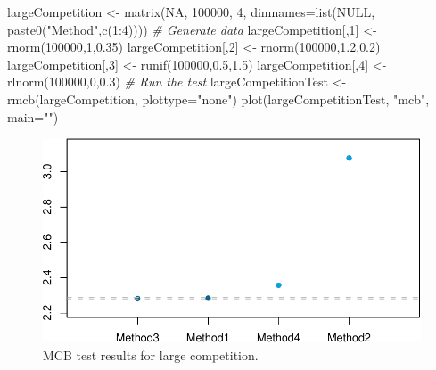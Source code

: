 \documentclass[
]{book}
\newenvironment{Shaded}{\begin{snugshade}}{\end{snugshade}}
\newcommand{\AttributeTok}[1]{\textcolor[rgb]{0.77,0.63,0.00}{#1}}
\newcommand{\CommentTok}[1]{\textcolor[rgb]{0.56,0.35,0.01}{\textit{#1}}}
\newcommand{\ConstantTok}[1]{\textcolor[rgb]{0.00,0.00,0.00}{#1}}
\newcommand{\DecValTok}[1]{\textcolor[rgb]{0.00,0.00,0.81}{#1}}
\newcommand{\FloatTok}[1]{\textcolor[rgb]{0.00,0.00,0.81}{#1}}
\newcommand{\FunctionTok}[1]{\textcolor[rgb]{0.00,0.00,0.00}{#1}}
\newcommand{\NormalTok}[1]{#1}
\newcommand{\OtherTok}[1]{\textcolor[rgb]{0.56,0.35,0.01}{#1}}
\newcommand{\SpecialCharTok}[1]{\textcolor[rgb]{0.00,0.00,0.00}{#1}}
\newcommand{\StringTok}[1]{\textcolor[rgb]{0.31,0.60,0.02}{#1}}
\theoremstyle{definition}
\theoremstyle{definition}
\theoremstyle{definition}
\theoremstyle{definition}
\theoremstyle{remark}
\begin{document}
\begin{Shaded}
\begin{Highlighting}[]
\NormalTok{largeCompetition }\OtherTok{\textless{}{-}} 
  \FunctionTok{matrix}\NormalTok{(}\ConstantTok{NA}\NormalTok{, }\DecValTok{100000}\NormalTok{, }\DecValTok{4}\NormalTok{,}
         \AttributeTok{dimnames=}\FunctionTok{list}\NormalTok{(}\ConstantTok{NULL}\NormalTok{, }\FunctionTok{paste0}\NormalTok{(}\StringTok{"Method"}\NormalTok{,}\FunctionTok{c}\NormalTok{(}\DecValTok{1}\SpecialCharTok{:}\DecValTok{4}\NormalTok{))))}
\CommentTok{\# Generate data}
\NormalTok{largeCompetition[,}\DecValTok{1}\NormalTok{] }\OtherTok{\textless{}{-}} \FunctionTok{rnorm}\NormalTok{(}\DecValTok{100000}\NormalTok{,}\DecValTok{1}\NormalTok{,}\FloatTok{0.35}\NormalTok{)}
\NormalTok{largeCompetition[,}\DecValTok{2}\NormalTok{] }\OtherTok{\textless{}{-}} \FunctionTok{rnorm}\NormalTok{(}\DecValTok{100000}\NormalTok{,}\FloatTok{1.2}\NormalTok{,}\FloatTok{0.2}\NormalTok{)}
\NormalTok{largeCompetition[,}\DecValTok{3}\NormalTok{] }\OtherTok{\textless{}{-}} \FunctionTok{runif}\NormalTok{(}\DecValTok{100000}\NormalTok{,}\FloatTok{0.5}\NormalTok{,}\FloatTok{1.5}\NormalTok{)}
\NormalTok{largeCompetition[,}\DecValTok{4}\NormalTok{] }\OtherTok{\textless{}{-}} \FunctionTok{rlnorm}\NormalTok{(}\DecValTok{100000}\NormalTok{,}\DecValTok{0}\NormalTok{,}\FloatTok{0.3}\NormalTok{)}
\CommentTok{\# Run the test}
\NormalTok{largeCompetitionTest }\OtherTok{\textless{}{-}} \FunctionTok{rmcb}\NormalTok{(largeCompetition, }\AttributeTok{plottype=}\StringTok{"none"}\NormalTok{)}
\FunctionTok{plot}\NormalTok{(largeCompetitionTest, }\StringTok{"mcb"}\NormalTok{, }\AttributeTok{main=}\StringTok{""}\NormalTok{)}
\end{Highlighting}
\end{Shaded}

\begin{figure}
\centering
\includegraphics{adam_files/figure-latex/mcbForCompetitionLarge-1.pdf}
\caption{\label{fig:mcbForCompetitionLarge}MCB test results for large competition.}
\end{figure}
\end{document}
